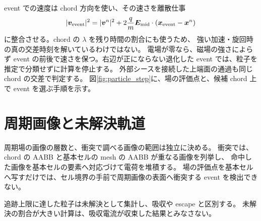 event での速度は chord 方向を使い、その速さを離散仕事
\begin{equation}
 |\bm{v}_{\mathrm{event}}|^2=|\bm{v}^n|^2+
 2\frac qm\bm{E}_{\mathrm{mid}}\cdot
       (\bm{x}_{\mathrm{event}}-\bm{x}^n)
\end{equation}
に整合させる。chord の $\lambda$ を残り時間の割合にも使うため、
強い加速・旋回時の真の交差時刻を解いているわけではない。
電場が零なら、磁場の強さによらず event の前後で速さを保つ。右辺が正にならない退化した event では、粒子を推定で分類せずに計算を停止する。
外部シースを接続した上端面の通過も同じ chord の交差で判定する。
図\ref{fig:particle_step}に、場の評価点と、候補 chord 上で event を選ぶ手順を示す。


\section{周期画像と未解決軌道}
周期場の画像の層数と、衝突で調べる画像の範囲は独立に決める。
衝突では、chord の AABB と基本セルの mesh の AABB が重なる画像を列挙し、
命中した画像を基本セルの要素へ対応づけて電荷を堆積する。
場の評価点を基本セルへ写すだけでは、セル境界の手前で周期画像の表面へ衝突する event を検出できない。

追跡上限に達した粒子は未解決として集計し、吸収や escape と区別する。
未解決の割合が大きい計算は、吸収電流が収束した結果とみなさない。

